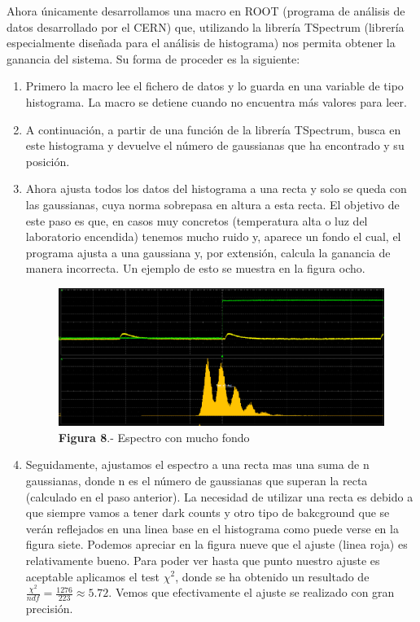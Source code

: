 Ahora únicamente desarrollamos una macro en ROOT (programa de análisis de datos desarrollado por el CERN) que, utilizando la librería TSpectrum (librería especialmente diseñada para el análisis de histograma) nos permita obtener la ganancia del sistema. Su forma de proceder es la siguiente:
\begin{enumerate}
\item {} Primero la macro lee el fichero de datos y lo guarda en una variable de tipo histograma. La macro se detiene cuando no encuentra más valores para leer.

\item {} A continuación, a partir de una función de la librería TSpectrum, busca en este histograma y devuelve el número de gaussianas que ha encontrado y su posición.

\item {} Ahora ajusta todos los datos del histograma a una recta y solo se queda con las gaussianas, cuya norma sobrepasa en altura a esta recta. El objetivo de este paso es que, en casos muy concretos (temperatura alta o luz del laboratorio encendida) tenemos mucho ruido y, aparece un fondo el cual, el programa ajusta a una gaussiana y, por extensión, calcula la ganancia de manera incorrecta. Un ejemplo de esto se muestra en la figura ocho.

\begin{figure}[hbtp]
\centering
\includegraphics[scale=0.4]{fondogaussiano.png}
\caption{\textbf{Figura 8}.- Espectro con mucho fondo}
\end{figure}

\item {} Seguidamente, ajustamos el espectro a una recta mas una suma de n gaussianas, donde n es el número de gaussianas que superan la recta (calculado en el paso anterior). La necesidad de utilizar una recta es debido a que siempre vamos a tener dark counts y otro tipo de bakcground que se verán reflejados en una linea base en el histograma como puede verse en la figura siete. Podemos apreciar en la figura nueve que el ajuste (linea roja) es relativamente bueno. Para poder ver hasta que punto nuestro ajuste es aceptable aplicamos el test $\chi^2$, donde se ha obtenido un resultado de $\frac{\chi^2}{ndf}=\frac{1276}{223}\approx 5.72$. Vemos que efectivamente el ajuste se realizado con gran precisión.


\end{enumerate}
